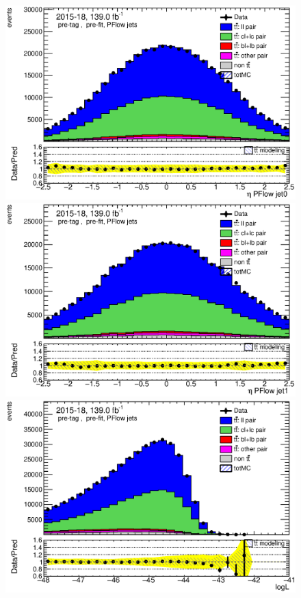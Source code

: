 \documentclass[letterpaper,12pt]{article}
\begin{document}
	
	\begin{figure}
	\begin{minipage}[b]{.45\textwidth}
	\centering
	\includegraphics[width=1\textwidth]{Oct_distributions/pretagNoRwDL1rwithhighpTPFlow_scaledall/DataMC_J0_eta.eps}
	\end{minipage}\hfill
	\begin{minipage}[b]{.45\textwidth}
	\centering
	\includegraphics[width=1\textwidth]{Oct_distributions/pretagNoRwDL1rwithhighpTPFlow_scaledall/DataMC_J1_eta.eps}
	\end{minipage}\hfill
	\begin{minipage}[b]{.45\textwidth}
	\centering
	\includegraphics[width=1\textwidth]{Oct_distributions/pretagNoRwDL1rwithhighpTPFlow_scaledall/DataMC_LLR.eps}

\end{minipage}
\end{figure}
\end{document}
